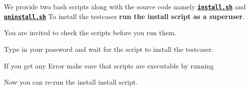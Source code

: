 We provide two bash scripts along with the source code namely 
\href{https://github.com/coder3101/testcaser/install.sh}{\texttt{ {\bfseries{install.\+sh}}}} and 
\href{https://github.com/coder3101/testcaser/install.sh}{\texttt{ {\bfseries{uninstall.\+sh}}}} To install the testcaser {\bfseries{run the install script as a superuser}}.

You are invited to check the scripts before you run them.


\begin{DoxyCode}{0}
\end{DoxyCode}


Type in your password and wait for the script to install the testcaser.

If you get any Error make sure that scripts are executable by running 
\begin{DoxyCode}{0}
\end{DoxyCode}


Now you can re-\/run the install install script. 